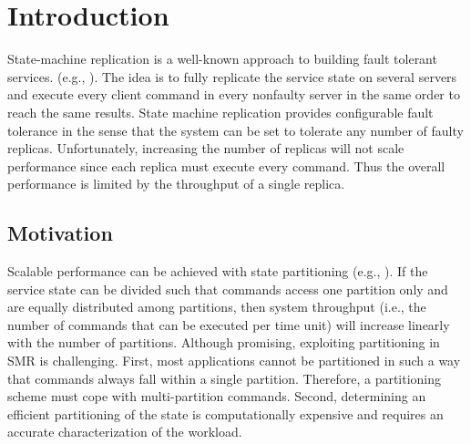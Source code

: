 \chapter[Introduction]{Introduction}

State-machine replication is a well-known approach to building fault tolerant
services. (e.g.,
\cite{Shvachko:2003,Ghemawat:2003,Burrows:2006,MacCormick:2004}). The idea is to
fully replicate the service state on several servers and execute every client
command in every nonfaulty server in the same order to reach the same results.
State machine replication provides configurable fault tolerance in the sense
that the system can be set to tolerate any number of faulty replicas.
Unfortunately, increasing the number of replicas will not scale performance
since each replica must execute every command. Thus the overall performance is
limited by the throughput of a single replica.

\section{Motivation}

Scalable performance can be achieved with state partitioning (e.g.,
\cite{facebookTAO, sciascia2012sdur, Aguilera:2007}). If the service state can
be divided such that commands access one partition only and are equally
distributed among partitions, then system throughput (i.e., the number of
commands that can be executed per time unit) will increase linearly with the
number of partitions. Although promising, exploiting partitioning in SMR is
challenging. First, most applications cannot be partitioned in such a way that
commands always fall within a single partition. Therefore, a partitioning scheme
must cope with multi-partition commands. Second, determining an efficient
partitioning of the state is computationally expensive and requires an accurate
characterization of the workload.

